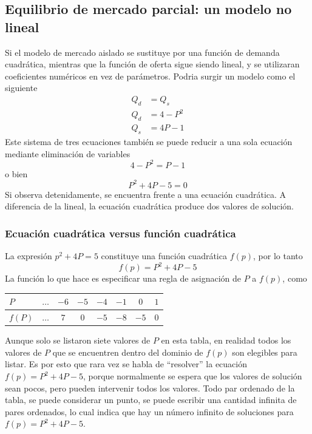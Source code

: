 \subsection{Equilibrio de mercado parcial: un modelo no lineal}

Si el modelo de mercado aislado se sustituye por una función de demanda cuadrática, mientras que la función de oferta sigue siendo lineal, y se utilizaran coeficientes numéricos en vez de parámetros. Podria surgir un modelo como el siguiente
\begin{equation}
    \begin{aligned}
        Q_d &= Q_s \\
        Q_d &= 4-P^2 \\
        Q_s &= 4P-1
    \end{aligned}
\end{equation}
Este sistema de tres ecuaciones también se puede reducir a una sola ecuación mediante eliminación de variables 
\[
4-P^2 = P-1
\]
o bien 
\[P^2+4P -5 = 0\]
Si observa detenidamente, se encuentra frente a una ecuación cuadrática. A diferencia de la lineal, la ecuación cuadrática produce dos valores de solución.

\subsubsection{Ecuación cuadrática versus función cuadrática}

La expresión \(p^2+4P=5\) constituye una función cuadrática \(f(p)\), por lo tanto 
\[
f(p)= P^2+4P-5
\]
La función lo que hace es especificar una regla de asignación de \(P\) a \(f(p)\), como 
\begin{tabular}{|l|c|c|c|c|c|c|c|}
\hline
$P$    & $\dots$ & $-6$ & $-5$ & $-4$ & $-1$ & $0$  & $1$ \\ \hline
$f(P)$ & $\dots$ & $7$  & $0$  & $-5$ & $-8$ & $-5$ & $0$ \\ \hline
\end{tabular}

Aunque solo se listaron siete valores de \(P\) en esta tabla, en realidad todos los valores de \(P\) que se encuentren dentro del dominio de \(f(p)\) son elegibles para listar. Es por esto que rara vez se habla de ``resolver'' la ecuación \(f(p) = P^2 +4P - 5\), porque normalmente se espera que los valores de solución sean pocos, pero pueden intervenir todos los valores. Todo par ordenado de la tabla, se puede considerar un punto, se puede escribir una cantidad infinita de pares ordenados, lo cual indica que hay un número infinito de soluciones para \(f(p) = P^2 +4P - 5\).

